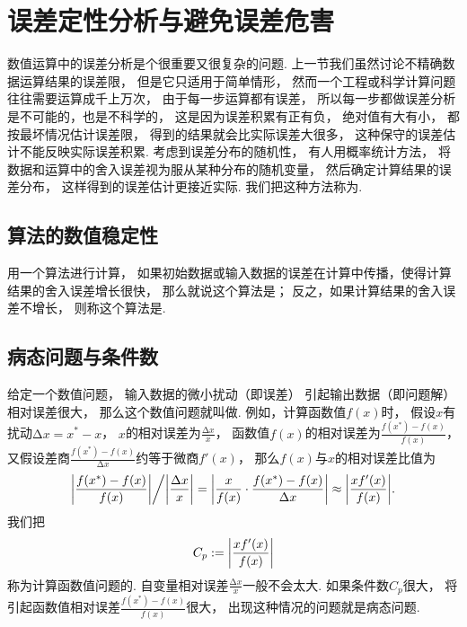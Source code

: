 \section{误差定性分析与避免误差危害}
数值运算中的误差分析是个很重要又很复杂的问题.
上一节我们虽然讨论不精确数据运算结果的误差限，
但是它只适用于简单情形，
然而一个工程或科学计算问题往往需要运算成千上万次，
由于每一步运算都有误差，
所以每一步都做误差分析是不可能的，也是不科学的，
这是因为误差积累有正有负，
绝对值有大有小，
都按最坏情况估计误差限，
得到的结果就会比实际误差大很多，
这种保守的误差估计不能反映实际误差积累.
考虑到误差分布的随机性，
有人用概率统计方法，
将数据和运算中的舍入误差视为服从某种分布的随机变量，
然后确定计算结果的误差分布，
这样得到的误差估计更接近实际.
我们把这种方法称为.

\subsection{算法的数值稳定性}
用一个算法进行计算，
如果初始数据或输入数据的误差在计算中传播，使得计算结果的舍入误差增长很快，
那么就说这个算法是；
反之，如果计算结果的舍入误差不增长，
则称这个算法是.

\subsection{病态问题与条件数}
给定一个数值问题，
输入数据的微小扰动（即误差）
引起输出数据（即问题解）相对误差很大，
那么这个数值问题就叫做.
例如，计算函数值\(f(x)\)时，
假设\(x\)有扰动\(\increment x = x^* - x\)，
\(x\)的相对误差为\(\frac{\increment x}{x}\)，
函数值\(f(x)\)的相对误差为\(\frac{f(x^*) - f(x)}{f(x)}\)，
又假设差商\(\frac{f(x^*) - f(x)}{\increment x}\)约等于微商\(f'(x)\)，
那么\(f(x)\)与\(x\)的相对误差比值为\begin{equation*}
	\abs{\frac{f(x^*) - f(x)}{f(x)}}
	\bigg/
	\abs{\frac{\Delta x}{x}}
	= \abs{\frac{x}{f(x)} \cdot \frac{f(x^*) - f(x)}{\Delta x}}
	\approx \abs{\frac{x f'(x)}{f(x)}}.
\end{equation*}
我们把\begin{equation*}
	C_p
	:=
	\abs{\frac{x f'(x)}{f(x)}}
\end{equation*}
称为计算函数值问题的.
自变量相对误差\(\frac{\increment x}{x}\)一般不会太大.
如果条件数\(C_p\)很大，
将引起函数值相对误差\(\frac{f(x^*) - f(x)}{f(x)}\)很大，
出现这种情况的问题就是病态问题.

